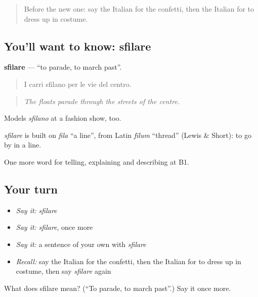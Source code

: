 \label{lesson:IT-C319-sfilare}



\begin{quote}
Before the new one: say the Italian for the confetti, then the Italian for to dress up in costume.
\end{quote}

\subsection*{You'll want to know: sfilare}
\textbf{sfilare} — \textquotedblleft{}to parade, to march past\textquotedblright{}.

\begin{quote}
I carri sfilano per le vie del centro.
\end{quote}

\begin{quote}
\emph{The floats parade through the streets of the centre.}
\end{quote}

Models \emph{sfilano} at a fashion show, too.

\begin{cousinweb}
\emph{sfilare} is built on \emph{fila} \textquotedblleft{}a line\textquotedblright{}, from Latin \emph{fīlum} \textquotedblleft{}thread\textquotedblright{} (Lewis \& Short): to go by in a line.
\end{cousinweb}

\begin{grammarlens}[title={What you've built}]
One more word for telling, explaining and describing at B1.
\end{grammarlens}

\subsection*{Your turn}
\begin{itemize}
\raggedright
  \item \emph{Say it:} \emph{sfilare}
  \item \emph{Say it:} \emph{sfilare}, once more
  \item \emph{Say it:} a sentence of your own with \emph{sfilare}
  \item \emph{Recall:} say the Italian for the confetti, then the Italian for to dress up in costume, then say \emph{sfilare} again
\end{itemize}

\begin{tcolorbox}[breakable,colback=teal!4,colframe=teal!35!black,title={Before you move on}]
What does sfilare mean? (\textquotedblleft{}To parade, to march past\textquotedblright{}.) Say it once more.
\end{tcolorbox}
